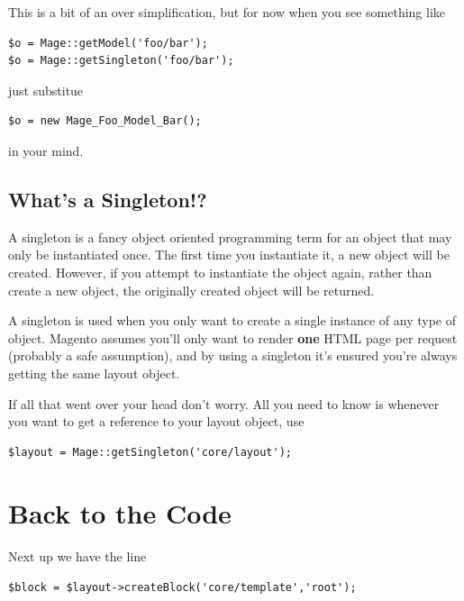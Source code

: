 \documentclass[oneside]{book}
\begin{document}
This is a bit of an over simplification, but for now when you see something like

\begin{lstlisting}
$o = Mage::getModel('foo/bar');
$o = Mage::getSingleton('foo/bar');

\end{lstlisting}


just substitue

\begin{lstlisting}
$o = new Mage_Foo_Model_Bar();

\end{lstlisting}


in your mind.

\subsection{What's a Singleton!?}

A singleton is a fancy object oriented programming term for an object that may only be instantiated once.  The first time you instantiate it, a new object will be created.  However, if you attempt to instantiate the object again, rather than create a new object, the originally created object will be returned.

A singleton is used when you only want to create a single instance of any type of object.  Magento assumes you'll only want to render \textbf{one} HTML page per request (probably a safe assumption), and by using a singleton it's ensured you're always getting the same layout object.

If all that went over your head don't worry.  All you need to know is whenever you want to get a reference to your layout object, use

\begin{lstlisting}
$layout = Mage::getSingleton('core/layout');

\end{lstlisting}


\section{Back to the Code}

Next up we have the line

\begin{lstlisting}
$block = $layout->createBlock('core/template','root');

\end{lstlisting}
\end{document}

